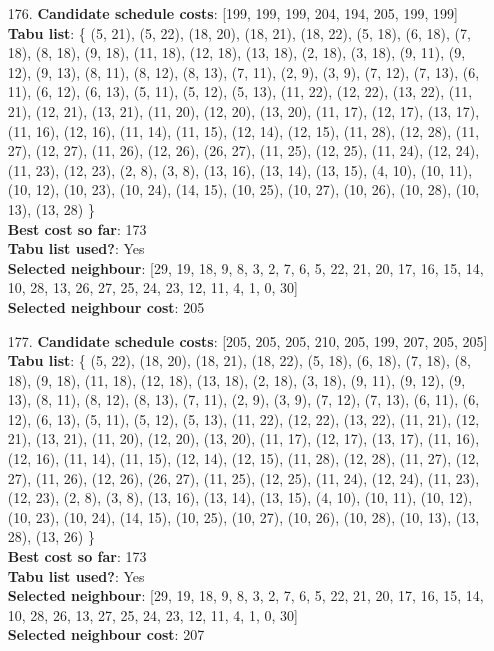 \documentclass[fleqn]{article}
\begin{document}
\begin{itemize}
    \item[176.] \textbf{Candidate schedule costs}: [199, 199, 199, 204, 194, 205, 199, 199] \\
    \textbf{Tabu list}: \{ (5, 21), (5, 22), (18, 20), (18, 21), (18, 22), (5, 18), (6, 18), (7, 18), (8, 18), (9, 18), (11, 18), (12, 18), (13, 18), (2, 18), (3, 18), (9, 11), (9, 12), (9, 13), (8, 11), (8, 12), (8, 13), (7, 11), (2, 9), (3, 9), (7, 12), (7, 13), (6, 11), (6, 12), (6, 13), (5, 11), (5, 12), (5, 13), (11, 22), (12, 22), (13, 22), (11, 21), (12, 21), (13, 21), (11, 20), (12, 20), (13, 20), (11, 17), (12, 17), (13, 17), (11, 16), (12, 16), (11, 14), (11, 15), (12, 14), (12, 15), (11, 28), (12, 28), (11, 27), (12, 27), (11, 26), (12, 26), (26, 27), (11, 25), (12, 25), (11, 24), (12, 24), (11, 23), (12, 23), (2, 8), (3, 8), (13, 16), (13, 14), (13, 15), (4, 10), (10, 11), (10, 12), (10, 23), (10, 24), (14, 15), (10, 25), (10, 27), (10, 26), (10, 28), (10, 13), (13, 28) \} \\
    \textbf{Best cost so far}: 173 \\
    \textbf{Tabu list used?}: Yes \\
    \textbf{Selected neighbour}: [29, 19, 18, 9, 8, 3, 2, 7, 6, 5, 22, 21, 20, 17, 16, 15, 14, 10, 28, 13, 26, 27, 25, 24, 23, 12, 11, 4, 1, 0, 30] \\
    \textbf{Selected neighbour cost}: 205
      

    \item[177.] \textbf{Candidate schedule costs}: [205, 205, 205, 210, 205, 199, 207, 205, 205] \\
    \textbf{Tabu list}: \{ (5, 22), (18, 20), (18, 21), (18, 22), (5, 18), (6, 18), (7, 18), (8, 18), (9, 18), (11, 18), (12, 18), (13, 18), (2, 18), (3, 18), (9, 11), (9, 12), (9, 13), (8, 11), (8, 12), (8, 13), (7, 11), (2, 9), (3, 9), (7, 12), (7, 13), (6, 11), (6, 12), (6, 13), (5, 11), (5, 12), (5, 13), (11, 22), (12, 22), (13, 22), (11, 21), (12, 21), (13, 21), (11, 20), (12, 20), (13, 20), (11, 17), (12, 17), (13, 17), (11, 16), (12, 16), (11, 14), (11, 15), (12, 14), (12, 15), (11, 28), (12, 28), (11, 27), (12, 27), (11, 26), (12, 26), (26, 27), (11, 25), (12, 25), (11, 24), (12, 24), (11, 23), (12, 23), (2, 8), (3, 8), (13, 16), (13, 14), (13, 15), (4, 10), (10, 11), (10, 12), (10, 23), (10, 24), (14, 15), (10, 25), (10, 27), (10, 26), (10, 28), (10, 13), (13, 28), (13, 26) \} \\
    \textbf{Best cost so far}: 173 \\
    \textbf{Tabu list used?}: Yes \\
    \textbf{Selected neighbour}: [29, 19, 18, 9, 8, 3, 2, 7, 6, 5, 22, 21, 20, 17, 16, 15, 14, 10, 28, 26, 13, 27, 25, 24, 23, 12, 11, 4, 1, 0, 30] \\
    \textbf{Selected neighbour cost}: 207
      


\end{itemize}
\end{document}
